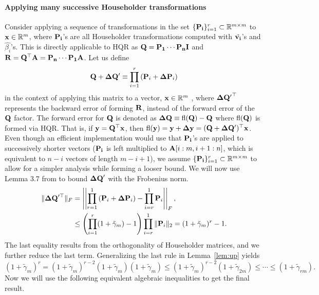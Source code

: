 \paragraph{Applying many successive Householder transformations}
Consider applying a sequence of transformations in the set $\{\mathbf{P_i}\}_{i=1}^r\subset\mathbb{R}^{m\times m}$ to $\mathbf{x}\in\mathbb{R}^m$, where $\mathbf{P_i}$'s are all Householder transformations computed with $\tilde{\mathbf{v_i}}$'s and $\hat{\beta_i}$'s.
This is directly applicable to HQR as $\mathbf{Q}=\mathbf{P_1}\cdots\mathbf{P_n}\mathbf{I}$ and $\mathbf{R} = \mathbf{Q}^{\top}\mathbf{A} = \mathbf{P_n}\cdots\mathbf{P_1}\mathbf{A}$.
Let us define $$\mathbf{Q}+\mathbf{\Delta Q'}\equiv \prod_{i=1}^{r}\left(\mathbf{P}_i +\mathbf{\Delta P}_i\right)$$ in the context of applying this matrix to a vector, $\mathbf{x}\in\mathbb{R}^m$ , where $\mathbf{\Delta Q'}^{\top}$ represents the backward error of forming $\mathbf{R}$, instead of the forward error of the $\mathbf{Q}$ factor. 
The forward error for $\mathbf{Q}$ is denoted as $\mathbf{\Delta Q} \equiv \mathrm{fl}(\mathbf{Q})-\mathbf{Q}$ where $\mathrm{fl}(\mathbf{Q})$ is formed via HQR.
That is, if $\mathbf{y} = \mathbf{Q}^{\top}\mathbf{x}$, then $\mathrm{fl}(\mathbf{y}) = \mathbf{y}+ \mathbf{\Delta y} = (\mathbf{Q}+\mathbf{\Delta Q'})^{\top}\mathbf{x}$.
Even though an efficient implementation would use that $\mathbf{P_i}$'s are applied to successively shorter vectors ($\mathbf{P_i}$ is left multiplied to $\mathbf{A}[i:m,i+1:n]$, which is equivalent to $n-i$ vectors of length $m-i+1$), we assume $\{\mathbf{P_i}\}_{i=1}^r\subset\mathbb{R}^{m\times m}$ to allow for a simpler analysis while forming a looser bound. 
We will now use Lemma 3.7 from \cite{Higham2002} to bound $\mathbf{\Delta Q}'$ with the Frobenius norm.
\begin{align}
\|\bb{\Delta Q}'^{\top}\|_F &= \left|\left| \prod_{r=1}^{1}\left(\bb{P}_i +\bb{\Delta P}_i\right) - \prod_{i=r}^{1}\bb{P}_i \right|\right|_F,\label{eqn:rPs}\\
&\leq \left(\prod_{i=1}^r(1+\tilde{\gamma}_m)-1\right)\prod_{i=r}^1\|\bb{P}_i\|_2 = (1+\tilde{\gamma}_m)^r-1. \label{eqn:rPs-uniform}
\end{align}
The last equality results from the orthogonality of Householder matrices, and we further reduce the last term.
Generalizing the last rule in Lemma~\ref{lem:up} yields
\begin{equation*}
(1+\tilde{\gamma}_m)^r = (1+\tilde{\gamma}_m)^{r-2}(1+\tilde{\gamma}_m)(1+\tilde{\gamma}_m) \leq  (1+\tilde{\gamma}_m)^{r-2}(1+\tilde{\gamma}_{2m}) \leq \cdots \leq (1+\tilde{\gamma}_{rm}).
\end{equation*}
Now we will use the following equivalent algebraic inequalities to get the final result.
